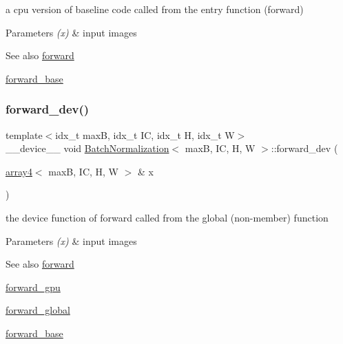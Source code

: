 a cpu version of baseline code called from the entry function (forward) 


\begin{DoxyParams}{Parameters}
{\em (x)} & input images \\
\hline
\end{DoxyParams}
\begin{DoxySeeAlso}{See also}
\hyperlink{structBatchNormalization_a315cda9d48dfa18a2f4f65ac7bb3b891}{forward} 

\hyperlink{structBatchNormalization_a95b82689b898e3e9940a98a0145eb6ca}{forward\+\_\+base} 
\end{DoxySeeAlso}
\mbox{\label{structBatchNormalization_a5c35968b76ca1a166fe93aede17b53e8}} 
\subsubsection{\texorpdfstring{forward\+\_\+dev()}{forward\_dev()}}
{\footnotesize\ttfamily template$<$idx\+\_\+t maxB, idx\+\_\+t IC, idx\+\_\+t H, idx\+\_\+t W$>$ \\
\+\_\+\+\_\+device\+\_\+\+\_\+ void \hyperlink{structBatchNormalization}{Batch\+Normalization}$<$ maxB, IC, H, W $>$\+::forward\+\_\+dev (\begin{DoxyParamCaption}\item[{\hyperlink{structarray4}{array4}$<$ maxB, IC, H, W $>$ \&}]{x }\end{DoxyParamCaption})\hspace{0.3cm}{\ttfamily [inline]}}



the device function of forward called from the global (non-\/member) function 


\begin{DoxyParams}{Parameters}
{\em (x)} & input images \\
\hline
\end{DoxyParams}
\begin{DoxySeeAlso}{See also}
\hyperlink{structBatchNormalization_a315cda9d48dfa18a2f4f65ac7bb3b891}{forward} 

\hyperlink{structBatchNormalization_a66c02d8d49ae80a8edd186024c04d42a}{forward\+\_\+gpu} 

\hyperlink{softmaxcrossentropy_8h_a578aeeb166bd06e800d9b396eab48b35}{forward\+\_\+global} 

\hyperlink{structBatchNormalization_a95b82689b898e3e9940a98a0145eb6ca}{forward\+\_\+base} 
\end{DoxySeeAlso}
\mbox{\label{structBatchNormalization_a66c02d8d49ae80a8edd186024c04d42a}} 
